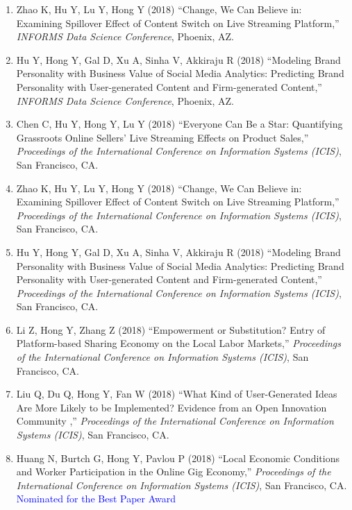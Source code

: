 \documentclass[paper=letter,fontsize=10pt]{scrartcl} %
\newcommand{\ConfEntry}[6]{
		\noindent #1 (#2) ``#3,'' \textit{#4}, #5. \textcolor{blue}{#6}}
\newcommand{\Hong}{Hong Y}
\begin{document}
\begin{enumerate}
\item \ConfEntry{Zhao K, Hu Y, Lu Y, \Hong}{2018}{Change, We Can Believe in: Examining Spillover Effect of Content Switch on Live Streaming Platform}{INFORMS Data Science Conference}{Phoenix, AZ}{}

\item \ConfEntry{Hu Y, \Hong, Gal D, Xu A, Sinha V, Akkiraju R}{2018}{Modeling Brand Personality with Business Value of Social Media Analytics: Predicting Brand Personality with User-generated Content and Firm-generated Content}{INFORMS Data Science Conference}{Phoenix, AZ}{}

\item \ConfEntry{Chen C, Hu Y, \Hong, Lu Y}{2018}{Everyone Can Be a Star: Quantifying Grassroots Online Sellers' Live Streaming Effects on Product Sales}{Proceedings of the International Conference on Information Systems (ICIS)}{San Francisco, CA}{}

\item \ConfEntry{Zhao K, Hu Y, Lu Y, \Hong}{2018}{Change, We Can Believe in: Examining Spillover Effect of Content Switch on Live Streaming Platform}{Proceedings of the International Conference on Information Systems (ICIS)}{San Francisco, CA}{}

\item \ConfEntry{Hu Y, \Hong, Gal D, Xu A, Sinha V, Akkiraju R}{2018}{Modeling Brand Personality with Business Value of Social Media Analytics: Predicting Brand Personality with User-generated Content and Firm-generated Content}{Proceedings of the International Conference on Information Systems (ICIS)}{San Francisco, CA}{}

\item \ConfEntry{Li Z, \Hong, Zhang Z}{2018}{Empowerment or Substitution? Entry of Platform-based Sharing Economy on the Local Labor Markets}{Proceedings of the International Conference on Information Systems (ICIS)}{San Francisco, CA}{}

\item \ConfEntry{Liu Q, Du Q, \Hong, Fan W}{2018}{What Kind of User-Generated Ideas Are More Likely to be Implemented? Evidence from an Open Innovation Community }{Proceedings of the International Conference on Information Systems (ICIS)}{San Francisco, CA}{}

\item \ConfEntry{Huang N, Burtch G, \Hong, Pavlou P}{2018}{Local Economic Conditions and Worker Participation in the Online Gig Economy}{Proceedings of the International Conference on Information Systems (ICIS)}{San Francisco, CA}{\protect\newline Nominated for the Best Paper Award}


\end{enumerate}
\end{document}
